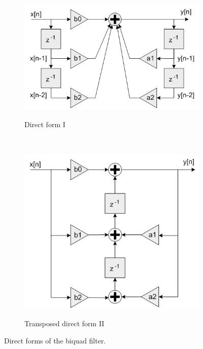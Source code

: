 \documentclass[a4paper,twoside,12pt]{book}
\begin{document}
\begin{figure}[H]
    \centering
    \begin{subfigure}[t]{0.55\textwidth}
        \includegraphics[width=\textwidth]{images/DF1}
        \label{fig:df1}
        \caption{Direct form I}
    \end{subfigure}
    ~
    \begin{subfigure}[t]{0.4\textwidth}
        \includegraphics[width=\textwidth]{images/DF2}
        \label{fig:df2}
        \caption{Transposed direct form II}
    \end{subfigure}
    \caption{Direct forms of the biquad filter\cite{CMSIS_DSP}.}
    \label{fig:biquad2}
\end{figure}
\end{document}
